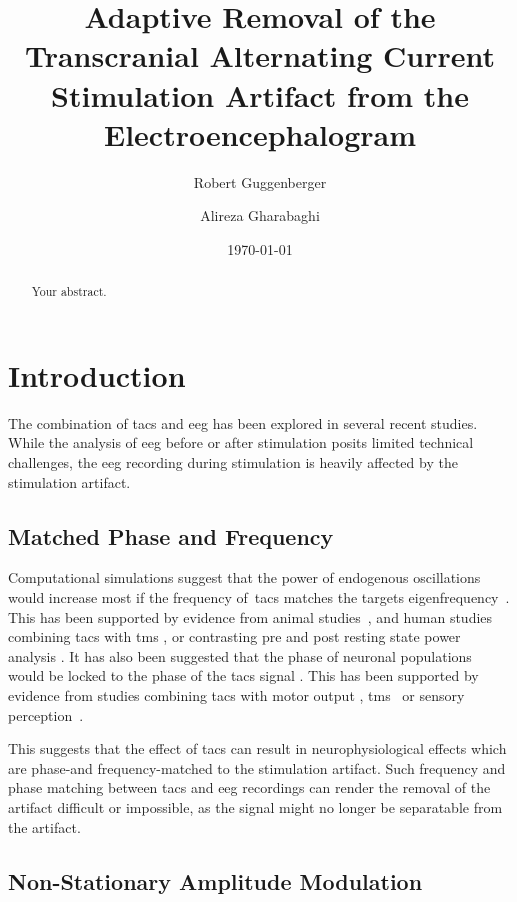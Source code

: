 \documentclass[a4paper]{article}
\title{Adaptive Removal of the Transcranial Alternating Current Stimulation Artifact from the Electroencephalogram}
\author[1,*]{Robert Guggenberger}
\author[1]{Alireza Gharabaghi}
\affil[1]{Department for Translational Neurosurgery, University Hospital Tübingen}
\affil[*]{Corresponding author: \email{robert.guggenberger@posteo.eu}}
\date{\today}
\begin{document}
\maketitle
\thispagestyle{fancy}

\begin{abstract}
Your abstract.
\end{abstract}

\section{Introduction}

The combination of \gls{tacs} and \gls{eeg} has been explored in several recent studies. While the analysis of \gls{eeg} before or after stimulation posits limited technical challenges, the \gls{eeg} recording during stimulation is heavily affected by the stimulation artifact.

\subsection{Matched Phase and Frequency}
Computational simulations suggest that the power of endogenous oscillations would increase most if the frequency of~\gls{tacs} matches the targets eigenfrequency~\citep{Kutchko_2013,Zaehle_2010}.
This has been supported by evidence from animal studies~\citep{Schmidt_2014}, and human studies combining \gls{tacs} with \gls{tms} \citep{Guerra_2016}, or contrasting pre and post resting state power analysis \citep{Zaehle_2010}.
It has also been suggested that the phase of neuronal populations would be locked to the phase of the \gls{tacs} signal \citep{Reato_2013}. This has been supported by evidence from studies combining \gls{tacs} with motor output \citep{Brittain_2013}, \gls{tms}~\citep{Raco_2016,Nakazono_2016} or sensory perception~\citep{Gundlach_2016}.

This suggests that the effect of \gls{tacs} can result in neurophysiological effects which are phase-and frequency-matched to the stimulation artifact. Such frequency and phase matching between \gls{tacs} and \gls{eeg} recordings can render the removal of the artifact difficult or impossible, as the signal might no longer be separatable from the artifact.

\subsection{Non-Stationary Amplitude Modulation}
\end{document}
